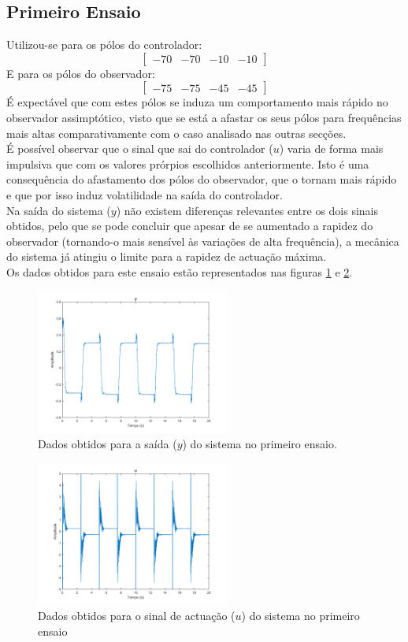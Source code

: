 \documentclass[%
  reprint,
  nofootinbib,
  amsmath,amssymb,
  aps,
  10pt,
  a4paper
]{revtex4-1}
\begin{document}
\subsection{Primeiro Ensaio}
Utilizou-se para os pólos do controlador:
\begin{equation}
\begin{bmatrix}
-70 & -70  & -10 &-10
\end{bmatrix}
\end{equation}
E para os pólos do observador:
\begin{equation}
\begin{bmatrix}
-75 & -75  & -45 &-45
\end{bmatrix}
\end{equation}
É expectável que com estes pólos se induza um comportamento mais rápido no observador assimptótico, visto que se está a afastar os seus pólos para frequências mais altas comparativamente com o caso analisado nas outras secções.\\
É possível observar que o sinal que sai do controlador ($u$) varia de forma mais impulsiva que com os valores prórpios escolhidos anteriormente. Isto é uma consequência do afastamento dos pólos do observador, que o tornam mais rápido e que por isso induz volatilidade na saída do controlador.\\
Na saída do sistema ($y$) não existem diferenças relevantes entre os dois sinais obtidos, pelo que se pode concluir que apesar de se aumentado a rapidez do observador (tornando-o mais sensível às variações de alta frequência), a mecânica do sistema já atingiu o limite para a rapidez de actuação máxima.\\
Os dados obtidos para este ensaio estão representados nas figuras \ref{fig:y_pri} e \ref{fig:u_pri}.
\begin{figure}[H]
\includegraphics[width=2.5in]{../imgs/dados_00_a/dados_00_a_y.png}
\caption{Dados obtidos para a saída ($y$) do sistema no primeiro ensaio.}
\label{fig:y_pri}
\end{figure}
\begin{figure}[H]
\includegraphics[width=2.5in]{../imgs/dados_00_a/dados_00_a_u.png}
\caption{Dados obtidos para o sinal de actuação ($u$) do sistema no primeiro ensaio}
\label{fig:u_pri}
\end{figure}
\end{document}
